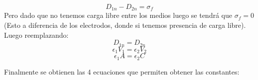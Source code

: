 \documentclass[
  11pt,
  letterpaper,
   addpoints,
   answers
  ]{exam}
\begin{document}
\begin{questions}
\begin{solution}
\begin{enumerate}
\begin{equation}
                D_{1n} - D_{2n} = \sigma_{f}
            \end{equation}
            Pero dado que no tenemos carga libre entre los medios luego se tendrá que $\sigma_{f}= 0$ (Esto a diferencia de los electrodos, donde si tenemos presencia de carga libre). Luego reemplazando:
            \begin{equation}
                 D_{1n} = D_{2n}
            \end{equation}
            \begin{equation}
                 \epsilon_{1}V_{1} = \epsilon_{2}V_{2}
            \end{equation}
            \begin{equation}
                 \epsilon_{1}A = \epsilon_{2}C
            \end{equation}
            
            Finalmente se obtienen las 4 ecuaciones que permiten obtener las constantes:
            

\end{enumerate}
\end{solution}
\end{questions}
\end{document}
